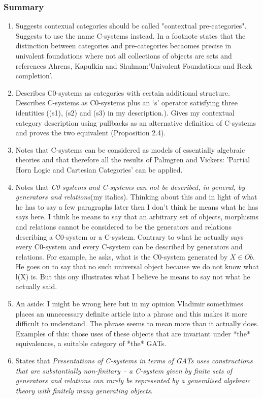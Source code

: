 \documentclass[14pt,a4paper]{scrartcl}
\begin{document}
\subsubsection{Summary}
\begin{enumerate}
\item Suggests contexual categories should be called  "contextual pre-categories". Suggests to use the name C-systems instead.
In a footnote states that the distinction between categories and pre-categories becaomes precise in univalent foundations where not all collections of objects are sets and references Ahrens, Kapulkin and Shulman:'Univalent Foundations and Rezk completion'.
\item Describes C0-systems as categories with certain additional structure. Describes C-systems as C0-systems plus an `s' operator satisfying three identities
((s1), (s2) and (s3) in my description.). Gives my contextual category description using pullbacks as an alternative definition of C-systems and proves the two equivalent (Proposition 2.4).
\item Notes that C-systems can be considered as models of essentially algebraic theories and that therefore all the results of Palmgren and Vickers: 'Partial Horn Logic and Cartesian Categories' can be applied. 
\item Notes that \textit{C0-systems and C-systems can not be described, in general, by generators and relations}(my italics). 
Thinking about this and in light of what he has to say a few paragraphs later then I don't think he means what he has says here.
I think he means to say that an arbitrary set of objects, morphisms and relations cannot be considered to be the generators and relations 
describing a C0-system or a C-system. Contrary to what he actually says every C0-system and every C-system can be described by generators and relations.
For example, he asks, what is the C0-system generated by $X \in Ob$. He goes on to say that no such universal object because we do not know what l(X) is. 
But this ony illustrates what I believe he means to say not what he actually said.
\item An aside: I might be wrong here but in my opinion Vladimir somethimes places an unnecessary definite article into a phrase 
and this makes it more difficult to understand. The phrase seems to mean more than it actually does. 
Examples of this: those uses of these objects that are invariant under *the* equivalences, a suitable category of *the* GATs. 
\item States that \textit{Presentations of C-systems in terms of GATs uses constructions that are substantially non-finitary -- a C-system given by finite sets of generators and relations can rarely be represented by a generalised algebraic theory with finitely many generating objects}. 

\end{enumerate}
\end{document}
